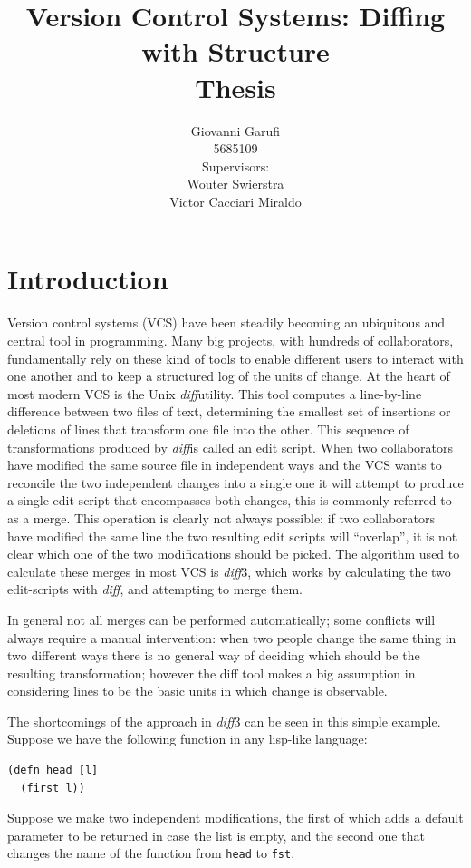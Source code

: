 \documentclass[11pt, titlepage]{article}
\title{Version Control Systems: Diffing with Structure
\\ Thesis}
\author{Giovanni Garufi\\5685109\\[1cm]{Supervisors: \\
    Wouter Swierstra \\
    Victor Cacciari Miraldo}}
\affil{Department of Computing Science\\University of Utrecht}
\newcommand{\toClojure}[1]{\texttt{#1}\xspace}
\newcommand{\diff}{\emph{diff}}
\begin{document}
  


\maketitle
\tableofcontents


\section{Introduction}
Version control systems (VCS) have been steadily becoming an ubiquitous and central 
tool in programming. Many big projects, with hundreds of collaborators, 
fundamentally rely on these kind of tools to enable different users to interact 
with one another and to keep a structured log of the units of change. 
At the heart of most modern VCS is the Unix \diff utility. This tool computes a 
line-by-line difference between two files of text, determining the smallest set 
of insertions or deletions of lines that transform one file into the other. This sequence of transformations produced by \diff is called an edit script. 
When two collaborators have modified the same source file in independent ways and the VCS wants to reconcile the two independent changes into a single one it will attempt to produce a single edit script that encompasses both changes, this is commonly referred to 
as a merge. This operation is clearly not always possible: if two collaborators have modified the same line the two resulting edit scripts will ``overlap'', it is not clear which one of the two modifications should be picked.  The algorithm used to calculate these merges in most VCS is \diff3, which works by calculating the two edit-scripts with \diff, and attempting to merge them.

In general not all merges can be performed automatically; some conflicts will always require a manual intervention: when two 
people change the same thing in two different ways there is no general way of 
deciding which should be the resulting transformation; however the diff tool makes a big assumption in considering lines to be the basic units in which change is observable. 

The shortcomings of the approach in \diff3 can be seen in this simple example.
Suppose we have the following function in any lisp-like language:

\begin{verbatim}
(defn head [l]
  (first l))
\end{verbatim}

Suppose we make two independent modifications, the first of which adds a default 
parameter to be returned in case the list is empty, and the second one that 
changes the name of the function from \toClojure{head} to \toClojure{fst}.
\end{document}
